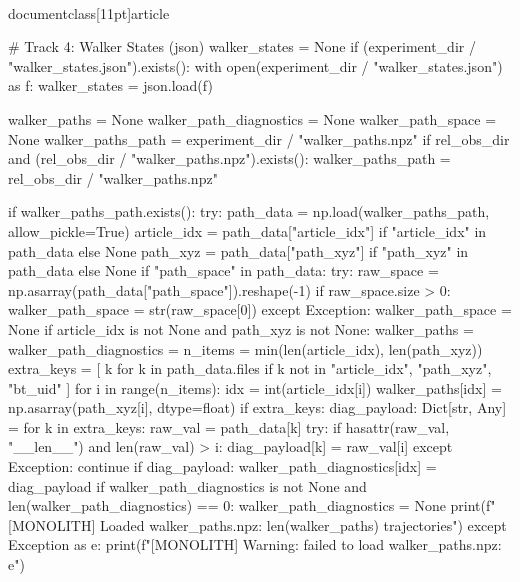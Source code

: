 \\documentclass[11pt]{article}
\begin{document}
\begin{CodeBlock}
    # Track 4: Walker States (json)
    walker_states = None
    if (experiment_dir / "walker_states.json").exists():
        with open(experiment_dir / "walker_states.json") as f:
            walker_states = json.load(f)

    walker_paths = None
    walker_path_diagnostics = None
    walker_path_space = None
    walker_paths_path = experiment_dir / "walker_paths.npz"
    if rel_obs_dir and (rel_obs_dir / "walker_paths.npz").exists():
        walker_paths_path = rel_obs_dir / "walker_paths.npz"

    if walker_paths_path.exists():
        try:
            path_data = np.load(walker_paths_path, allow_pickle=True)
            article_idx = path_data["article_idx"] if "article_idx" in path_data else None
            path_xyz = path_data["path_xyz"] if "path_xyz" in path_data else None
            if "path_space" in path_data:
                try:
                    raw_space = np.asarray(path_data["path_space"]).reshape(-1)
                    if raw_space.size > 0:
                        walker_path_space = str(raw_space[0])
                except Exception:
                    walker_path_space = None
            if article_idx is not None and path_xyz is not None:
                walker_paths = {}
                walker_path_diagnostics = {}
                n_items = min(len(article_idx), len(path_xyz))
                extra_keys = [
                    k for k in path_data.files
                    if k not in {"article_idx", "path_xyz", "bt_uid"}
                ]
                for i in range(n_items):
                    idx = int(article_idx[i])
                    walker_paths[idx] = np.asarray(path_xyz[i], dtype=float)
                    if extra_keys:
                        diag_payload: Dict[str, Any] = {}
                        for k in extra_keys:
                            raw_val = path_data[k]
                            try:
                                if hasattr(raw_val, "__len__") and len(raw_val) > i:
                                    diag_payload[k] = raw_val[i]
                            except Exception:
                                continue
                        if diag_payload:
                            walker_path_diagnostics[idx] = diag_payload
                if walker_path_diagnostics is not None and len(walker_path_diagnostics) == 0:
                    walker_path_diagnostics = None
                print(f"[MONOLITH] Loaded walker_paths.npz: {len(walker_paths)} trajectories")
        except Exception as e:
            print(f"[MONOLITH] Warning: failed to load walker_paths.npz: {e}")


\end{CodeBlock}
\end{document}
